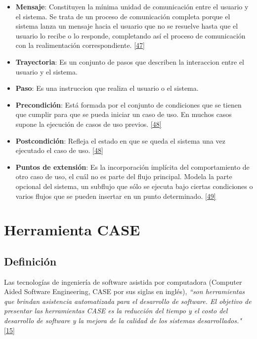 \begin{itemize}
\item \textbf{Mensaje}: Constituyen la mínima unidad de comunicación entre el usuario y el sistema. Se trata de un proceso de comunicación completa porque el sistema lanza un mensaje hacia el usuario que no se resuelve hasta que el usuario lo recibe o lo responde, completando así el proceso de comunicación con la realimentación correspondiente. \hyperlink{b47}{[47]}

\item \textbf{Trayectoria}: Es un conjunto de pasos que describen la interaccion entre el usuario y el sistema.

\item \textbf{Paso}: Es una instruccion que realiza el usuario o el sistema.

\item \textbf{Precondición}: Está formada por el conjunto de condiciones que se tienen que cumplir para que se pueda iniciar un caso de uso. En muchos casos supone la ejecución de casos de uso previos. \hyperlink{b48}{[48]}

\item \textbf{Postcondición}: Refleja el estado en que se queda el sistema una vez ejecutado el caso de uso. \hyperlink{b48}{[48]}

\item \textbf{Puntos de extensión}: Es la incorporación implícita del comportamiento de otro caso de uso, el cuál no es parte del flujo principal. Modela la parte opcional del sistema, un subflujo que sólo se ejecuta bajo ciertas condiciones o varios flujos que se pueden insertar en un punto determinado. \hyperlink{b49}{[49]}
\end{itemize}

\section{Herramienta CASE}

\subsection{Definición}

Las tecnologías de ingeniería de software asistida por computadora (Computer Aided Software Engineering, CASE por sus siglas en inglés), \textit {``son herramientas que brindan asistencia automatizada para el desarrollo de software. El objetivo de presentar las herramientas CASE es la reducción del tiempo y el costo del desarrollo de software y la mejora de la calidad de los sistemas desarrollados."} \hyperlink{b15}{[15]}\\

